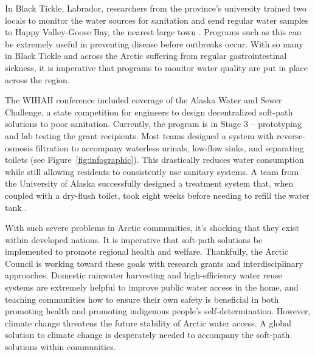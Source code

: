 \documentclass[american]{../../../coursework}
\begin{document}
In Black Tickle, Labrador, researchers from the province's university trained
two locals to monitor the water sources for sanitation and send regular water
samples to Happy Valley-Goose Bay, the nearest large town
\parencite{Hanrahan2014}. Programs such as this can be extremely useful in
preventing disease before outbreaks occur. With so many in Black Tickle and
across the Arctic suffering from regular gastrointestinal sickness, it is
imperative that programs to monitor water quality are put in place across the
region.

The WIHAH conference included coverage of the Alaska Water and Sewer
Challenge, a state competition for engineers to design decentralized soft-path
solutions to poor sanitation. Currently, the program is in Stage 3 --
prototyping and lab testing the grant recipients. Most teams designed a system
with reverse-osmosis filtration to accompany waterless urinals, low-flow
sinks, and separating toilets (see Figure~\ref{fig:infographic}). This
drastically reduces water consumption while still allowing residents to
consistently use sanitary systems. A team from the University of Alaska
successfully designed a treatment system that, when coupled with a dry-flush
toilet, took eight weeks before needing to refill the water tank
\parencite{Dotson2016}.

With such severe problems in Arctic communities, it's shocking that they exist
within developed nations. It is imperative that soft-path solutions be
implemented to promote regional health and welfare. Thankfully, the Arctic
Council is working toward these goals with research grants and
interdisciplinary approaches. Domestic rainwater harvesting and
high-efficiency water reuse systems are extremely helpful to improve public
water access in the home, and teaching communities how to ensure their own
safety is beneficial in both promoting health and promoting indigenous
people's self-determination. However, climate change threatens the future
stability of Arctic water access. A global solution to climate change is
desperately needed to accompany the soft-path solutions within communities.

\printbibliography
\end{document}
